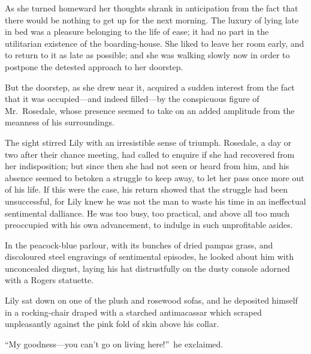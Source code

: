 \documentclass[12pt,a4paper]{book}
\begin{document}
As she turned homeward her thoughts shrank in anticipation from
the fact that there would be nothing to get up for the next
morning. The luxury of lying late in bed was a pleasure belonging
to the life of ease; it had no part in the utilitarian existence
of the boarding-house. She liked to leave her room early, and to
return to it as late as possible; and she was walking slowly now
in order to postpone the detested approach to her doorstep.





But the doorstep, as she drew near it, acquired a sudden interest
from the fact that it was occupied---and indeed filled---by the
conspicuous figure of Mr.\ Rosedale, whose presence seemed to take
on an added amplitude from the meanness of his surroundings.





The sight stirred Lily with an irresistible sense of triumph. 
Rosedale, a day or two after their chance meeting, had called to
enquire if she had recovered from her indisposition; but since
then she had not seen or heard from him, and his absence seemed
to betoken a struggle to keep away, to let her pass once more out
of his life. If this were the case, his return showed that the
struggle had been unsuccessful, for Lily knew he was not the man
to waste his time in an ineffectual sentimental dalliance. He was
too busy, too practical, and above all too much preoccupied with
his own advancement, to indulge in such unprofitable asides.





In the peacock-blue parlour, with its bunches of dried pampas
grass, and discoloured steel engravings of sentimental episodes,
he looked about him with unconcealed disgust, laying his hat
distrustfully on the dusty console adorned with a Rogers
statuette.





Lily sat down on one of the plush and rosewood sofas, and he
deposited himself in a rocking-chair draped with a starched
antimacassar which scraped unpleasantly against the pink fold of
skin above his collar.





``My goodness---you can't go on living here!''\ he exclaimed.
\end{document}
